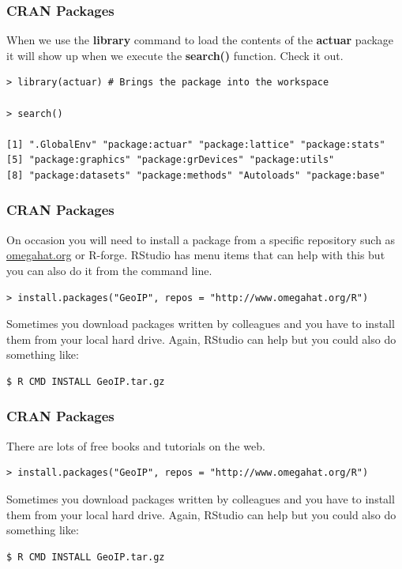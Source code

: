 \documentclass{beamer}
\begin{document}

\begin{frame}[fragile]
\frametitle{CRAN Packages}
When we use the \textbf{library} command to load the contents of the \textbf{actuar} package it will show up when we execute the \textbf{search()} function. Check it out.
\\
\footnotesize
\begin{verbatim}
> library(actuar) # Brings the package into the workspace

> search()

[1] ".GlobalEnv" "package:actuar" "package:lattice" "package:stats" 
[5] "package:graphics" "package:grDevices" "package:utils" 
[8] "package:datasets" "package:methods" "Autoloads" "package:base"
\end{verbatim}
\end{frame}


\begin{frame}[fragile]
\frametitle{CRAN Packages}
On occasion you will need to install a package from a specific repository such as \url{omegahat.org} or R-forge. RStudio has menu items that can help with this but you can also do it from the command line. 
\newline
\\
\footnotesize
\begin{verbatim}
> install.packages("GeoIP", repos = "http://www.omegahat.org/R")
\end{verbatim}
\normalsize
Sometimes you download packages written by colleagues and you have to install them from your local hard drive. Again, RStudio can help but you could also do something like:
\newline
\begin{verbatim}
$ R CMD INSTALL GeoIP.tar.gz
\end{verbatim}
\end{frame}



\begin{frame}[fragile]
\frametitle{CRAN Packages}
There are lots of free books and tutorials on the web.
\newline
\\
\footnotesize
\begin{verbatim}
> install.packages("GeoIP", repos = "http://www.omegahat.org/R")
\end{verbatim}
\normalsize
Sometimes you download packages written by colleagues and you have to install them from your local hard drive. Again, RStudio can help but you could also do something like:
\newline
\begin{verbatim}
$ R CMD INSTALL GeoIP.tar.gz
\end{verbatim}
\end{frame}
\end{document}
